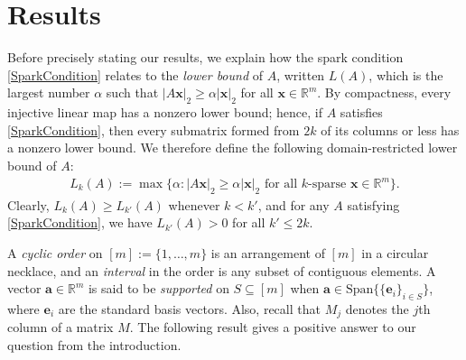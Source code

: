 \documentclass[journal, twocolumn]{IEEEtran}
\begin{document}
\section{Results}\label{Results}

Before precisely stating our results, we explain how the spark condition \eqref{SparkCondition} relates to the \emph{lower bound} \cite{Grcar10} of $A$, written $L(A)$, which is the largest number $\alpha$ such that $|A\mathbf{x}|_2 \geq \alpha|\mathbf{x}|_2$ for all $\mathbf{x} \in \mathbb{R}^m$. By compactness, every injective linear map has a nonzero lower bound; hence, if $A$ satisfies \eqref{SparkCondition}, then every submatrix formed from $2k$ of its columns or less has a nonzero lower bound. We therefore define the following domain-restricted lower bound of $A$:
\begin{align*}
L_k(A) := \max \{ \alpha : |A\mathbf{x}|_2 \geq \alpha|\mathbf{x}|_2 \text{ for all $k$-sparse } \mathbf{x} \in \mathbb{R}^m\}.
\end{align*} 
Clearly, $L_k(A) \geq L_{k'}(A)$ whenever $k < k'$, and for any $A$ satisfying \eqref{SparkCondition}, we have $L_{k'}(A) > 0$ for all $k' \leq 2k$. 

A \textit{cyclic order} on $[m] := \{1, \ldots,m\}$ is an arrangement of $[m]$ in a circular necklace, and an \textit{interval} in the order is any subset of contiguous elements. A vector $\mathbf{a} \in \mathbb{R}^m$ is said to be \emph{supported} on $S \subseteq [m]$ when $\mathbf{a} \in \text{Span}\{ \{\mathbf{e}_i\}_{i\in S}\}$, where $\mathbf{e}_i$ are the standard basis vectors.  Also, recall that $M_j$ denotes the $j$th column of a matrix $M$. The following result gives a positive answer to our question from the introduction.
\end{document}
